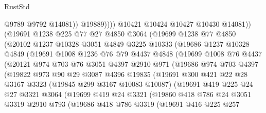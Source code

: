 \begin{lexlean}{RustStd}
\begin{coremodule}
                      @9789
                      @9792
                      @14081))
                  @19889))))
          @10421
          @10424
          @10427
          @10430
          @14081))
      (@19691
        @1238
        @225
        @77
        @27
        @4850
        @3064
        (@19699
          @1238
          @77
          @4850
          (@20102
            @1237
            @10328
            @3051
            @4849
            @3225
            @10333
            (@19686
              @1237
              @10328
              @4849
              (@19691
                @1008
                @1236
                @76
                @79
                @4437
                @4848
                (@19699
                  @1008
                  @76
                  @4437
                  (@20121
                    @974
                    @703
                    @76
                    @3051
                    @4397
                    @2910
                    @971
                    (@19686
                      @974
                      @703
                      @4397
                      (@19822
                        @973
                        @90
                        @29
                        @3087
                        @4396
                        @19835
                        (@19691
                          @300
                          @421
                          @22
                          @28
                          @3167
                          @3323
                          (@19845 @299 @3167 @10083 @10087)
                          (@19691
                            @419
                            @225
                            @24
                            @27
                            @3321
                            @3064
                            (@19699
                              @419
                              @24
                              @3321
                              (@19860
                                @418
                                @786
                                @24
                                @3051
                                @3319
                                @2910
                                @793
                                (@19686
                                  @418
                                  @786
                                  @3319
                                  (@19691
                                    @416
                                    @225
                                    @257

\end{coremodule}
\end{lexlean}
